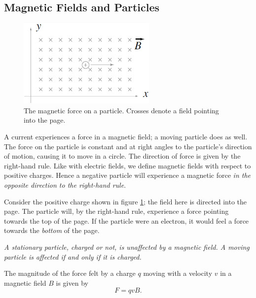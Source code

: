 \documentclass[a4paper]{amsbook}
\newcommand\capcite[1]{}
\begin{document}
\subsection{Magnetic Fields and Particles}
\begin{figure}
  \centering
  \includegraphics[width=0.6\textwidth]{magforce2}
  \caption{The magnetic force on a particle. Crosses denote a field pointing into the page. \capcite{https://i.stack.imgur.com/8M8qC.png}\label{fig:magforce2}}
\end{figure}
A current experiences a force in a magnetic field; a moving particle does as well. The force on the particle
is constant and at right angles to the particle's direction of motion, causing it to move in a circle. The direction
of force is given by the right-hand rule. Like with electric fields, we define magnetic fields with respect to
positive charges. Hence a negative particle will experience a magnetic force \textit{in the opposite direction to
the right-hand rule}.

Consider the positive charge shown in figure \ref{fig:magforce2}; the field here is directed into the page. The particle will,
by the right-hand rule, experience a force pointing towards the top of the page. If the particle were an electron, it would feel
a force towards the \textit{bottom} of the page.

\textit{A stationary particle, charged or not, is unaffected by a magnetic field. A moving particle is affected if and only if
it is charged.}

The magnitude of the force felt by a charge $ q $ moving with a velocity $ v $ in a magnetic field $ B $ is given by
\begin{equation}
  F = qvB.
\end{equation}
\end{document}
